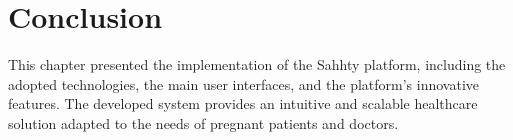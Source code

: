 
\section{Conclusion}

This chapter presented the implementation of the Sahhty platform, including the adopted technologies, the main user interfaces, and the platform’s innovative features. The developed system provides an intuitive and scalable healthcare solution adapted to the needs of pregnant patients and doctors.

